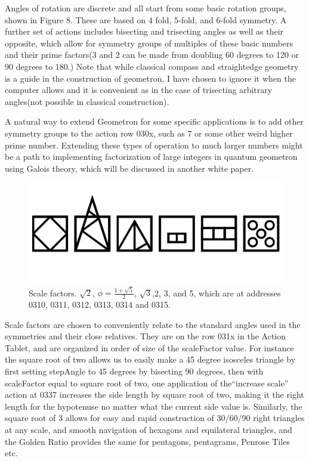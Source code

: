 \documentclass[11pt]{article}
\begin{document}
    Angles of rotation are discrete and all start from some basic rotation groups, shown in Figure 8.  These are based on 4 fold, 5-fold, and 6-fold symmetry.  A further set of actions includes bisecting and trisecting angles as well as their opposite, which allow for symmetry groups of multiples of these basic numbers and their prime factors(3 and 2 can be made from doubling 60 degrees to 120 or 90 degrees to 180.)  Note that while classical compass and straightedge geometry is a guide in the construction of geometron, I have chosen to ignore it when the computer allows and it is convenient as in the case of trisecting arbitrary angles(not possible in classical construction).      

    A natural way to extend Geometron for some specific applications is to add other symmetry groups to the action row 030x, such as 7 or some other weird higher prime number.  Extending these types of operation to much larger numbers might be a path to implementing factorization of large integers in quantum geometron using Galois theory, which will be discussed in another white paper.


\begin{figure}

\includegraphics[width=\linewidth]{figures/figure9_scales.png}

\caption{Scale factors.  $\sqrt{2}$, $\phi = \frac{1 + \sqrt{5}}{2}$, $\sqrt{3}$,2, 3, and 5, which are at addresses 0310, 0311, 0312, 0313, 0314 and 0315.}
\end{figure}


    Scale factors are chosen to conveniently relate to the standard angles used in the symmetries and their close relatives.  They are on the row 031x in the Action Tablet, and are organized in order of size of the scaleFactor value.  For instance the square root of two allows us to easily make a 45 degree isosceles triangle by first setting stepAngle to 45 degrees by bisecting 90 degrees, then with scaleFactor equal to square root of two, one application of the``increase scale'' action at 0337 increases the side length by square root of two, making it the right length for the hypotenuse no matter what the current side value is.  Similarly, the square root of 3 allows for easy and rapid construction of 30/60/90 right triangles at any scale, and smooth navigation of hexagons and equilateral triangles, and the Golden Ratio provides the same for pentagons, pentagrams, Penrose Tiles etc.  
\end{document}
